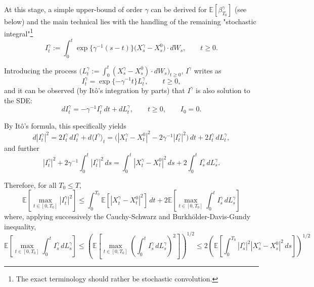 \documentclass[11pt]{article}
\theoremstyle{remark}
\begin{document}
At this stage, a simple upper-bound of order $\gamma$ can be derived for $\mathbb{E}[\beta_{T_0}^\gamma]$ (see below) and the main technical lies with the handling of the remaining "stochastic integral"\footnote{The exact terminology should rather be stochastic convolution.}
\[
I_t^\gamma:=\int_0^t \exp\{\gamma^{-1}(s-t)\}\bigl(X_s^\gamma-X_s^0\bigr)\cdot dW_s,\qquad t\ge 0.
\]


Introducing the process $\bigl(L_t^\gamma:=\int_0^t (X_s^\gamma-X_s^0)\cdot dW_s\bigr)_{t\ge0}$, $I^\gamma$ writes as
\[
I_t^\gamma=\exp\{-\gamma^{-1}t\}L_t^\gamma,\qquad t\ge0,
\]
and it can be observed (by It\^o's integration by parts) that $I^\gamma$ is also solution to the SDE:
\[
dI_t^\gamma=-\gamma^{-1}I_t^\gamma\,dt+dL_t^\gamma,\qquad t\ge0,\qquad I_0=0.
\]

By It\^o's formula, this specifically yields
\[
d|I_t^\gamma|^2=2I_t^\gamma\,dI_t^\gamma+d\langle I^\gamma\rangle_t
=\bigl(|X_t^\gamma-X_t^0|^2-2\gamma^{-1}|I_t^\gamma|^2\bigr)\,dt+2I_t^\gamma\,dL_t^\gamma,
\]
and further
\[
|I_t^\gamma|^2+2\gamma^{-1}\int_0^t |I_t^\gamma|^2\,ds
=\int_0^t |X_t^\gamma-X_t^0|^2\,ds+2\int_0^t I_s^\gamma\,dL_s^\gamma.
\]

Therefore, for all $T_0\le T$,
\[
\mathbb{E}\!\left[\max_{t\in[0,T_0]}|I_t^\gamma|^2\right]
\le \int_0^{T_0}\mathbb{E}\!\left[|X_t^\gamma-X_t^0|^2\right]\,dt
+2\mathbb{E}\!\left[\max_{t\in[0,T_0]}\int_0^t I_s^\gamma\,dL_s^\gamma\right]
\]
where, applying successively the Cauchy-Schwarz and Burkh\"older-Davis-Gundy inequality,
\begin{equation}
\mathbb{E}\!\left[\max_{t\in[0,T_0]}\int_0^t I_s^\gamma\,dL_s^\gamma\right]
\le \left(\mathbb{E}\!\left[\max_{t\in[0,T_0]}\left(\int_0^t I_s^\gamma\,dL_s^\gamma\right)^2\right]\right)^{1/2}
\le 2\left(\mathbb{E}\!\left[\int_0^{T_0}|I_s^\gamma|^2|X_s^\gamma-X_s^0|^2\,ds\right]\right)^{1/2}
\tag{3.13}
\end{equation}
\end{document}
